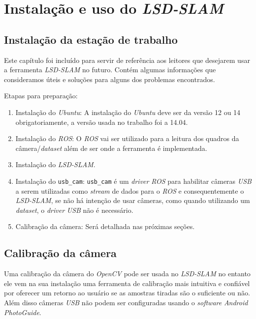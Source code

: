 \chapter{Instalação e uso do \textit{LSD-SLAM}}

\renewcommand{\tablename}{Listagem}

\section{Instalação da estação de trabalho}

Este capítulo foi incluído para servir de referência aos leitores que desejarem usar a ferramenta \textit{LSD-SLAM} no futuro. Contém algumas informações que consideramos úteis e soluções para alguns dos problemas encontrados.

Etapas para preparação:

\begin{enumerate}
	\item{Instalação do \textit{Ubuntu}: A instalação do \textit{Ubuntu} deve ser da versão 12 ou 14 obrigatoriamente, a versão usada no trabalho foi a 14.04.}
	\item{Instalação do  \textit{ROS}: O \textit{ROS} vai ser utilizado para a leitura dos quadros da câmera/\textit{dataset} além de ser onde a ferramenta é implementada.\cite{ROS-Tutorial}}
	\item{Instalação do \textit{LSD-SLAM}.\cite{GitHub-LSD-SLAM}}
	\item{Instalação do  \texttt{usb\_cam}: \texttt{usb\_cam} é um \textit{driver} \textit{ROS} para habilitar câmeras \textit{USB} a serem utilizadas como \textit{stream} de dados para o \textit{ROS} e consequentemente o \textit{LSD-SLAM}, se não há intenção de usar câmeras, como quando utilizando um \textit{dataset}, o \textit{driver} \textit{USB} não é necessário.}
	\item{Calibração da câmera: Será detalhada nas próximas seções.}
\end{enumerate}

\section{Calibração da câmera}

Uma calibração da câmera do \textit{OpenCV} pode ser usada no \textit{LSD-SLAM} no entanto ele vem na sua instalação uma ferramenta de calibração mais intuitiva e confiável por oferecer um retorno ao usuário se as amostras tiradas são o suficiente ou não. Além disso câmeras \textit{USB} não podem ser configuradas usando o \textit{software} \textit{Android} \textit{PhotoGuide}.

